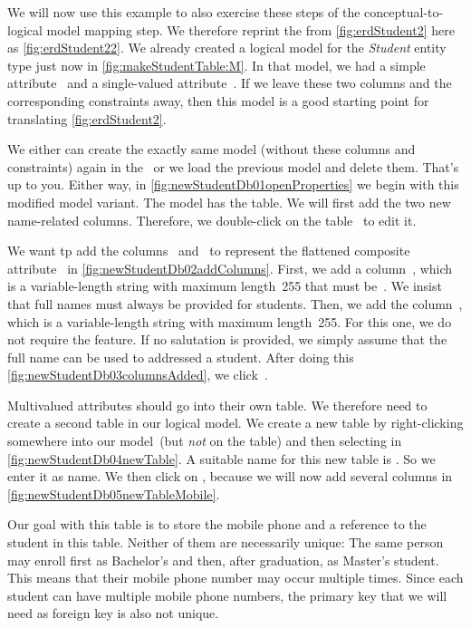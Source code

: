 We will now use this example to also exercise these steps of the conceptual-to-logical model mapping step.
We therefore reprint the  from \cref{fig:erdStudent2} here as \cref{fig:erdStudent22}.
We already created a logical model for the \emph{Student} entity type just now in \cref{fig:makeStudentTable:M}.
In that model, we had a simple attribute~ and a single-valued attribute~.
If we leave these two columns and the corresponding constraints away, then this model is a good starting point for translating \cref{fig:erdStudent2}.

We either can create the exactly same model (without these columns and constraints) again in the \pgmodeler\ or we load the previous model and delete them.
That's up to you.
Either way, in \cref{fig:newStudentDb01openProperties} we begin with this modified model variant.
The model has the  table.
We will first add the two new name-related columns.
Therefore, we double-click on the table~ to edit it.

We want tp add the columns~ and~ to represent the flattened composite attribute~ in \cref{fig:newStudentDb02addColumns}.
First, we add a column~, which is a variable-length string with maximum length~255 that must be~.
We insist that full names must always be provided for students.
Then, we add the column~, which is a variable-length string with maximum length~255.
For this one, we do not require the  feature.
If no salutation is provided, we simply assume that the full name can be used to addressed a student.
After doing this \cref{fig:newStudentDb03columnsAdded}, we click~.

Multivalued attributes should go into their own table.
We therefore need to create a second table in our logical model.
We create a new table by right-clicking somewhere into our model~(but \emph{not} on the  table) and then selecting  in \cref{fig:newStudentDb04newTable}.
A suitable name for this new table is .
So we enter it as name.
We then click on , because we will now add several columns in \cref{fig:newStudentDb05newTableMobile}.

Our goal with this table is to store the mobile phone and a reference to the student in this table.
Neither of them  are necessarily unique:
The same person may enroll first as Bachelor's and then, after graduation, as Master's student.
This means that their mobile phone number may occur multiple times.
Since each student can have multiple mobile phone numbers, the primary key  that we will need as foreign key is also not unique.

